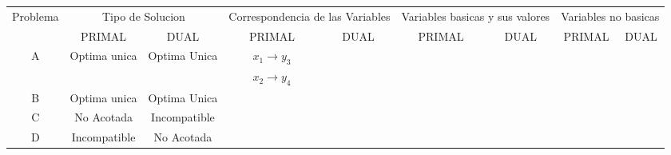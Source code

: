     \begin{tabular}{c|cc|cc|cc|cc}
    \hline
    \hline
    Problema & \multicolumn{2}{c|}{Tipo de Solucion } & \multicolumn{2}{c|}{Correspondencia de las Variables} & \multicolumn{2}{c|}{Variables basicas  y sus valores} & \multicolumn{2}{c}{Variables no basicas} \bigstrut[t]\\
            & PRIMAL  & DUAL    & PRIMAL  & DUAL    & PRIMAL  & DUAL    & PRIMAL  & DUAL \bigstrut[b]\\
    \hline
    \hline
    \multirow{2}[2]{*}{A} & \multirow{2}[2]{*}{Optima unica} & \multirow{2}[2]{*}{Optima Unica} & $x_1 \rightarrow y_3$ &         &         &         &         &  \bigstrut[t]\\
            &         &         &   $x_2 \rightarrow y_4$ &         &         &         &         &  \bigstrut[b]\\
    \hline
    \multirow{3}[2]{*}{B} & \multirow{3}[2]{*}{Optima unica} & \multirow{3}[2]{*}{Optima Unica} &         &         &         &         &         &  \bigstrut[t]\\
            &         &         &         &         &         &         &         &  \\
            &         &         &         &         &         &         &         &  \bigstrut[b]\\
    \hline
    \multirow{2}[2]{*}{C} & \multirow{2}[2]{*}{No Acotada} & \multirow{2}[2]{*}{Incompatible} &         &         &         &         &         &  \bigstrut[t]\\
            &         &         &         &         &         &         &         &  \bigstrut[b]\\
    \hline
    \multirow{2}[2]{*}{D} & \multirow{2}[2]{*}{Incompatible} & \multirow{2}[2]{*}{No Acotada} &         &         &         &         &         &  \bigstrut[t]\\
            &         &         &         &         &         &         &         &  \bigstrut[b]\\
    \hline
    \hline
    \end{tabular}%
